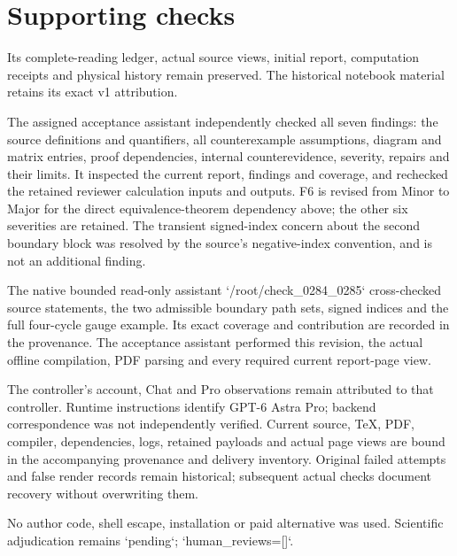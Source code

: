 \documentclass[10pt]{article}
\begin{document}
\section*{Supporting checks}
Its complete-reading ledger, actual source views, initial report, computation receipts and physical history remain preserved. The historical notebook material retains its exact v1 attribution.\par
The assigned acceptance assistant independently checked all seven findings: the source definitions and quantifiers, all counterexample assumptions, diagram and matrix entries, proof dependencies, internal counterevidence, severity, repairs and their limits. It inspected the current report, findings and coverage, and rechecked the retained reviewer calculation inputs and outputs. F6 is revised from Minor to Major for the direct equivalence-theorem dependency above; the other six severities are retained. The transient signed-index concern about the second boundary block was resolved by the source’s negative-index convention, and is not an additional finding.\par
The native bounded read-only assistant `/root/check\_0284\_0285` cross-checked source statements, the two admissible boundary path sets, signed indices and the full four-cycle gauge example. Its exact coverage and contribution are recorded in the provenance. The acceptance assistant performed this revision, the actual offline compilation, PDF parsing and every required current report-page view.\par
The controller’s account, Chat and Pro observations remain attributed to that controller. Runtime instructions identify GPT-6 Astra Pro; backend correspondence was not independently verified. Current source, TeX, PDF, compiler, dependencies, logs, retained payloads and actual page views are bound in the accompanying provenance and delivery inventory. Original failed attempts and false render records remain historical; subsequent actual checks document recovery without overwriting them.\par
No author code, shell escape, installation or paid alternative was used. Scientific adjudication remains `pending`; `human\_reviews=[]`.\par
\end{document}
